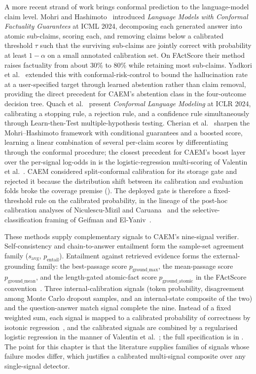 A more recent strand of work brings conformal prediction to the language-model claim level. Mohri and Hashimoto~\cite{mohri2024conformal} introduced \emph{Language Models with Conformal Factuality Guarantees} at ICML 2024, decomposing each generated answer into atomic sub-claims, scoring each, and removing claims below a calibrated threshold $\tau$ such that the surviving sub-claims are jointly correct with probability at least $1-\alpha$ on a small annotated calibration set. On FActScore their method raises factuality from about 30\% to 80\% while retaining most sub-claims. Yadkori et al.~\cite{yadkori2024abstention} extended this with conformal-risk-control to bound the hallucination rate at a user-specified target through learned abstention rather than claim removal, providing the direct precedent for CAEM's abstention class in the four-outcome decision tree. Quach et al.~\cite{quach2024conformal} present \emph{Conformal Language Modeling} at ICLR 2024, calibrating a stopping rule, a rejection rule, and a confidence rule simultaneously through Learn-then-Test multiple-hypothesis testing. Cherian et al.~\cite{cherian2024conformal} sharpen the Mohri--Hashimoto framework with conditional guarantees and a boosted score, learning a linear combination of several per-claim scores by differentiating through the conformal procedure; the closest precedent for CAEM's boost layer over the per-signal log-odds in  is the logistic-regression multi-scoring of Valentin et al.~\cite{valentin2024hallucination}. CAEM considered split-conformal calibration for its storage gate and rejected it because the distribution shift between its calibration and evaluation folds broke the coverage premise (). The deployed gate is therefore a fixed-threshold rule on the calibrated probability, in the lineage of the post-hoc calibration analyses of Niculescu-Mizil and Caruana~\cite{niculescu2005predicting} and the selective-classification framing of Geifman and El-Yaniv~\cite{geifman2017selective}.

These methods supply complementary signals to CAEM's nine-signal verifier. Self-consistency and chain-to-answer entailment form the sample-set agreement family ($s_{\text{avg}}$, $p_{\text{entail}}$). Entailment against retrieved evidence forms the external-grounding family: the best-passage score $p_{\text{ground\_max}}$, the mean-passage score $p_{\text{ground\_mean}}$, and the length-gated atomic-fact score $p_{\text{ground\_atomic}}$ in the FActScore convention~\cite{min-etal-2023-factscore}. Three internal-calibration signals (token probability, disagreement among Monte Carlo dropout samples, and an internal-state composite of the two) and the question-answer match signal complete the nine. Instead of a fixed weighted sum, each signal is mapped to a calibrated probability of correctness by isotonic regression~\cite{niculescu2005predicting}, and the calibrated signals are combined by a regularised logistic regression in the manner of Valentin et al.~\cite{valentin2024hallucination}; the full specification is in . The point for this chapter is that the literature supplies families of signals whose failure modes differ, which justifies a calibrated multi-signal composite over any single-signal detector.

